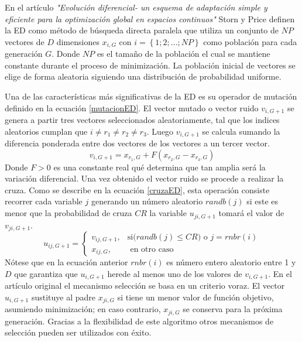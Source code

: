En el artículo \textit{"Evolución diferencial- un esquema de adaptación simple y eficiente para la optimización global en espacios continuos"} Storn y Price definen la ED como método de búsqueda directa paralela que utiliza un conjunto de $NP$ vectores  de $D$ dimensiones $x_{i,G}$ con $i =\left\lbrace 1; 2; ...; NP\right\rbrace $  como población para cada generación $G$. Donde $NP$ es el tamaño de la población el cual se mantiene constante durante el proceso de minimización. La población inicial de vectores se elige de forma aleatoria siguiendo una distribución de probabilidad uniforme.

Una de las características más significativas de la ED es su operador de mutación definido en la ecuación \ref{mutacionED}. El vector mutado o vector ruido $v_{i,G+1}$ se genera a partir tres vectores seleccionados aleatoriamente, tal que los indices aleatorios cumplan que $ i \neq r_1 \neq r_2 \neq r_3$. Luego $v_{i,G+1}$ se calcula sumando la diferencia ponderada entre dos vectores de los vectores a un tercer vector.
\begin{equation} \label{mutacionED}
v_{i,G+1} = x_{r_1,G} + F (x_{r_2 ,G}-x_{r_3,G})
\end{equation}
Donde $F >0$ es una constante real qué determina que tan amplia será la variación diferencial. Una vez obtenido el vector ruido se procede a realizar la cruza. Como se describe en la ecuación \ref{cruzaED}, esta operación consiste recorrer cada variable $j$  generando un número aleatorio $randb(j)$  si este es menor que la probabilidad de cruza $CR$ la variable $u_{ji,G+1}$ tomará el valor de  $v_{ji,G+1}$. 
\begin{equation} \label{cruzaED}
  u_{ij,G+1} = 
\begin{cases}
    v_{ij,G+1},& \text{si($randb(j) \leq CR$) o $j=rnbr(i)$}\\
    x_{ij,G},& \text{ en otro caso}
\end{cases}
\end{equation}
Nótese que en la ecuación anterior $rnbr(i)$ es número entero aleatorio entre 1 y $D$ que garantiza que  $u_{i,G+1}$ herede al menos uno de los valores de $v_{i,G+1}$. En el artículo original el mecanismo selección se basa en un criterio voraz. El vector $u_{i,G+1}$ sustituye al padre  $x_{ji,G}$ si tiene un menor valor de función objetivo, asumiendo minimización; en caso contrario, $x_{ji,G}$ se conserva para la próxima generación. Gracias a la flexibilidad de este algoritmo otros mecanismos de selección pueden ser utilizados con éxito. 

